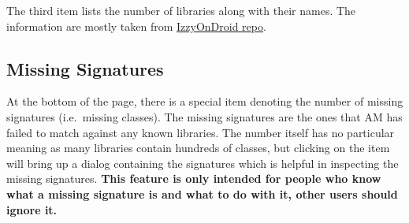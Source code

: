 The third item lists the number of libraries along with their names. The information are mostly taken from
\href{https://gitlab.com/IzzyOnDroid/repo}{IzzyOnDroid repo}.


\subsection{Missing Signatures}\label{subsec:missing-signatures} %
At the bottom of the page, there is a special item denoting the number of missing signatures (i.e.\ missing classes).
The missing signatures are the ones that AM has failed to match against any known libraries. The number itself has no
particular meaning as many libraries contain hundreds of classes, but clicking on the item will bring up a dialog
containing the signatures which is helpful in inspecting the missing signatures. \textbf{This feature is only intended
for people who know what a missing signature is and what to do with it, other users should ignore it.}
